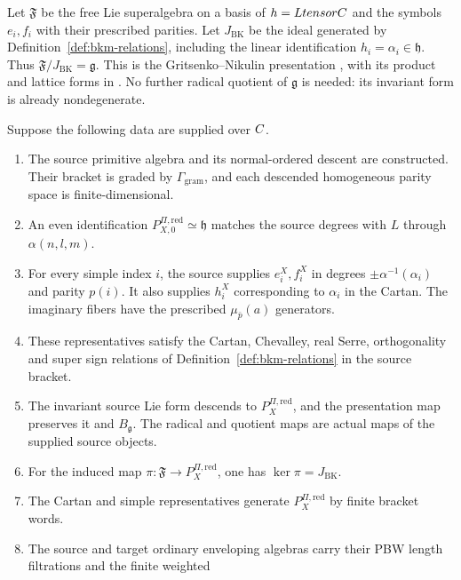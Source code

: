 Let $\mathfrak F$ be the free Lie superalgebra on a basis of
$h=LtensorC$ and the symbols $e_i,f_i$ with their
prescribed parities. Let $J_{\mathrm{BK}}$ be the ideal generated
by Definition~\ref{def:bkm-relations}, including the linear
identification $h_i=\alpha_i\in\mathfrak h$. Thus
$\mathfrak F/J_{\mathrm{BK}}=\mathfrak g$.
This is the Gritsenko--Nikulin presentation
\cite[Section~3 and Statement~6.4]{GN}, with its product and lattice
forms in \cite{GNPartI,GNII,BorcherdsGKM88,KAC:1}.
No further radical quotient of $\mathfrak g$ is needed: its invariant
form is already nondegenerate.

\begin{theorem}
\label{thm:primitive-recognition}
Suppose the following data are supplied over $C$.
\begin{enumerate}
\item[\textup{(S1)}] The source primitive algebra and its
normal-ordered descent are constructed. Their bracket is graded by
$\Gamma_{\mathrm{gram}}$, and each descended homogeneous parity
space is finite-dimensional.
\item[\textup{(S2)}] An even identification
$P^{\Pi,\mathrm{red}}_{X,0}\simeq\mathfrak h$ matches the source
degrees with $L$ through $\alpha(n,l,m)$.
\item[\textup{(S3)}] For every simple index $i$, the source supplies $e_i^X,f_i^X$
in degrees $\pm\alpha^{-1}(\alpha_i)$ and parity $p(i)$.
It also supplies $h_i^X$ corresponding to $\alpha_i$ in the Cartan. The imaginary
fibers have the prescribed $\mu_{\bar p}(a)$ generators.
\item[\textup{(S4)}] These representatives satisfy the Cartan,
Chevalley, real Serre, orthogonality and super sign relations of
Definition~\ref{def:bkm-relations} in the source bracket.
\item[\textup{(S5)}] The invariant source Lie form descends to
$P_X^{\Pi,\mathrm{red}}$, and the presentation map preserves it
and $B_{\mathfrak g}$. The radical and quotient maps are actual
maps of the supplied source objects.
\item[\textup{(S6)}] For the induced map
$\pi:\mathfrak F\to P_X^{\Pi,\mathrm{red}}$, one has
$\ker\pi=J_{\mathrm{BK}}$.
\item[\textup{(S7)}] The Cartan and simple representatives
generate $P_X^{\Pi,\mathrm{red}}$ by finite bracket words.
\item[\textup{(S8)}] The source and target ordinary enveloping
algebras carry their PBW length filtrations and the finite weighted

\end{enumerate}
\end{theorem}
